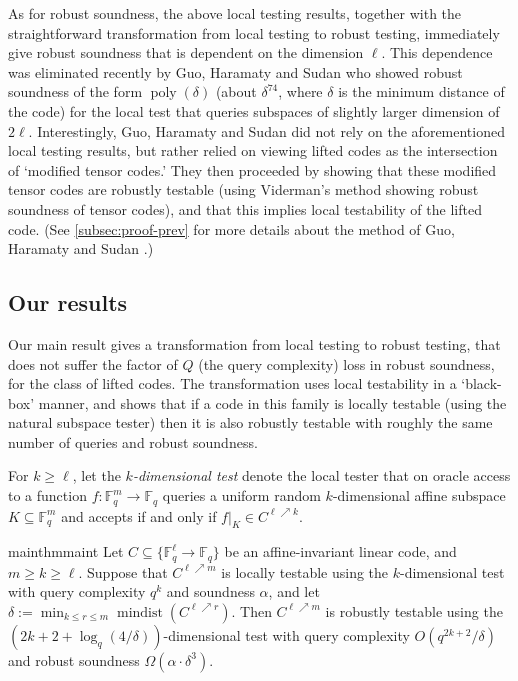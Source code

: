 \documentclass[11pt]{article}
\numberwithin{equation}{section}
\theoremstyle{definition}
\theoremstyle{plain}
\theoremstyle{plain}
\DeclareMathOperator{\poly}{poly} %
\DeclareMathOperator{\mindist}{mindist}  %
\newcommand{\F}{{\mathbb{F}}}
\newcommand{\Func}[1]{\{\F_q^{#1} \to \F_q\}}
\begin{document}
As for robust soundness, the above local testing results, together with the straightforward transformation from local testing to robust testing, immediately give robust soundness that is dependent on the dimension $\ell$. This
dependence %
was eliminated recently by Guo, Haramaty and Sudan \cite{GuoHS2015} who showed robust soundness of the form $\poly(\delta)$ (about $\delta^{74}$,  where $\delta$ is the %
minimum     %
distance of the code) for the local test that queries subspaces of slightly larger dimension of $2\ell$. Interestingly,  Guo, Haramaty and Sudan \cite{GuoHS2015} did not rely on the aforementioned local testing results, but rather relied on viewing lifted codes as the intersection of
`modified tensor codes.'  %
They then proceeded by showing that these modified tensor codes are robustly testable (using %
Viderman's method   %
\cite{Viderman2015} showing robust soundness of tensor codes), and that this implies local testability of the lifted
%
code.  (See  %
\cref{subsec:proof-prev} for more details about the 
%
method of  Guo, %
Haramaty  %
and Sudan \cite{GuoHS2015}.) %

\subsection{Our results}

Our main result gives a transformation from local testing to robust testing,  that does not suffer the factor of $Q$ (the query complexity) loss in robust soundness, for the class of lifted codes. The transformation uses local testability in a `black-box' manner, and shows that if a code in this family is locally testable (using the natural subspace tester) then it is also robustly testable with roughly the same number of queries and robust soundness.

For $k \geq \ell$, let the
%
%
%
%
%
\emph{$k$-dimensional test}
denote the local tester that on oracle access to a function 
$f: \F_q^m \to \F_q$ queries a uniform random $k$-dimensional 
affine subspace
%
$K \subseteq \F_q^m$  %
and accepts if and only if $f|_K \in C^{\ell \nearrow k}$.


\begin{restatable}{mainthm}{maint}\label{thm:main}
%
Let $C \subseteq \Func{\ell}$ be an affine-invariant linear code, and
$m \geq k \geq \ell$. Suppose that $C^{\ell \nearrow m}$ is locally 
testable using the
$k$-dimensional test with query complexity $q^{k}$ and soundness $\alpha$, 
and let  $\delta:= \min_{ k \leq r \leq m}\mindist(C^{\ell \nearrow r})$.
Then $C^{\ell \nearrow m}$ is robustly testable using the $(2k+2+\log_q(4/\delta))$-dimensional test
 with query complexity $O(q^{2k+2}/\delta)$ and
  robust soundness $\Omega(\alpha \cdot \delta^3)$.
%
\end{restatable}
\end{document}
